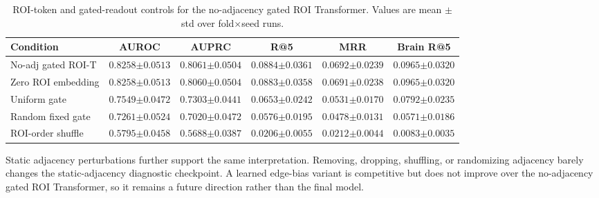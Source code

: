 \documentclass{article}
\begin{document}
\begin{table}[!htbp]
  \centering
  \caption{ROI-token and gated-readout controls for the no-adjacency gated ROI Transformer. Values are mean $\pm$ std over fold$\times$seed runs.}
  \label{tab:roi_token_controls}
  \scriptsize
  \setlength{\tabcolsep}{4pt}
  \renewcommand{\arraystretch}{1.15}
  \begin{tabular}{lccccc}
    \toprule
    Condition & AUROC & AUPRC & R@5 & MRR & Brain R@5 \\
    \midrule
    No-adj gated ROI-T & $\mathbf{0.8258{\scriptstyle\pm0.0513}}$ & $\mathbf{0.8061{\scriptstyle\pm0.0504}}$ & $\mathbf{0.0884{\scriptstyle\pm0.0361}}$ & $\mathbf{0.0692{\scriptstyle\pm0.0239}}$ & $\mathbf{0.0965{\scriptstyle\pm0.0320}}$ \\
    Zero ROI embedding & $0.8258{\scriptstyle\pm0.0513}$ & $0.8060{\scriptstyle\pm0.0504}$ & $0.0883{\scriptstyle\pm0.0358}$ & $0.0691{\scriptstyle\pm0.0238}$ & $0.0965{\scriptstyle\pm0.0320}$ \\
    Uniform gate & $0.7549{\scriptstyle\pm0.0472}$ & $0.7303{\scriptstyle\pm0.0441}$ & $0.0653{\scriptstyle\pm0.0242}$ & $0.0531{\scriptstyle\pm0.0170}$ & $0.0792{\scriptstyle\pm0.0235}$ \\
    Random fixed gate & $0.7261{\scriptstyle\pm0.0524}$ & $0.7020{\scriptstyle\pm0.0472}$ & $0.0576{\scriptstyle\pm0.0195}$ & $0.0478{\scriptstyle\pm0.0131}$ & $0.0571{\scriptstyle\pm0.0186}$ \\
    ROI-order shuffle & $0.5795{\scriptstyle\pm0.0458}$ & $0.5688{\scriptstyle\pm0.0387}$ & $0.0206{\scriptstyle\pm0.0055}$ & $0.0212{\scriptstyle\pm0.0044}$ & $0.0083{\scriptstyle\pm0.0035}$ \\
    \bottomrule
  \end{tabular}
\end{table}

Static adjacency perturbations further support the same interpretation. Removing, dropping, shuffling, or randomizing adjacency barely changes the static-adjacency diagnostic checkpoint. A learned edge-bias variant is competitive but does not improve over the no-adjacency gated ROI Transformer, so it remains a future direction rather than the final model.
\end{document}
